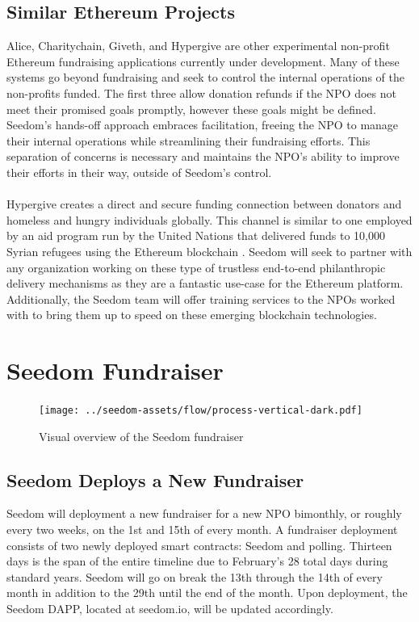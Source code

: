 \documentclass[11pt]{article}
\begin{document}
\subsection{Similar Ethereum Projects}

Alice, Charitychain, Giveth, and Hypergive are other experimental non-profit Ethereum fundraising applications currently under development. Many of these systems go beyond fundraising and seek to control the internal operations of the non-profits funded. The first three allow donation refunds if the NPO does not meet their promised goals promptly, however these goals might be defined. Seedom's hands-off approach embraces facilitation, freeing the NPO to manage their internal operations while streamlining their fundraising efforts. This separation of concerns is necessary and maintains the NPO's ability to improve their efforts in their way, outside of Seedom's control.\\\\
Hypergive creates a direct and secure funding connection between donators and homeless and hungry individuals globally. This channel is similar to one employed by an aid program run by the United Nations that delivered funds to 10,000 Syrian refugees using the Ethereum blockchain \cite{6}. Seedom will seek to partner with any organization working on these type of trustless end-to-end philanthropic delivery mechanisms as they are a fantastic use-case for the Ethereum platform. Additionally, the Seedom team will offer training services to the NPOs worked with to bring them up to speed on these emerging blockchain technologies.

\section{Seedom Fundraiser}

\begin{figure}[H]
\begin{center}
\texttt{[image: ../seedom-assets/flow/process-vertical-dark.pdf]}
\caption{Visual overview of the Seedom fundraiser}
\label{figure:fundraiserMonthlyTimeline}
\end{center}
\end{figure}

\subsection{Seedom Deploys a New Fundraiser}

Seedom will deployment a new fundraiser for a new NPO bimonthly, or roughly every two weeks, on the 1st and 15th of every month. A fundraiser deployment consists of two newly deployed smart contracts: Seedom and polling. Thirteen days is the span of the entire timeline due to February's 28 total days during standard years. Seedom will go on break the 13th through the 14th of every month in addition to the 29th until the end of the month. Upon deployment, the Seedom DAPP, located at seedom.io, will be updated accordingly.
\end{document}
